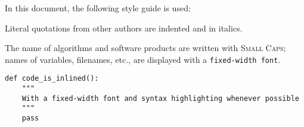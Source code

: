 In this document, the following style guide is used:

\begin{displayquote}
    Literal quotations from other authors are indented and in italics.
\end{displayquote}

The name of algorithms and software products are written with \textsc{Small Caps};
names of variables, filenames, etc., are displayed with a \texttt{fixed-width font}.

\begin{verbatim}
def code_is_inlined():
    """
    With a fixed-width font and syntax highlighting whenever possible
    """
    pass
\end{verbatim}

